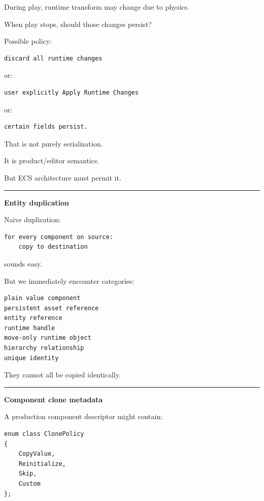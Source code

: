 During play, runtime transform may change due to physics.

When play stops, should those changes persist?

Possible policy:

\begin{verbatim}
discard all runtime changes
\end{verbatim}

or:

\begin{verbatim}
user explicitly Apply Runtime Changes
\end{verbatim}

or:

\begin{verbatim}
certain fields persist.
\end{verbatim}

That is not purely serialization.

It is product/editor semantics.

But ECS architecture must permit it.

\begin{center}\rule{0.5\linewidth}{0.5pt}\end{center}

\textbf{Entity duplication}

Naive duplication:

\begin{verbatim}
for every component on source:
    copy to destination
\end{verbatim}

sounds easy.

But we immediately encounter categories:

\begin{verbatim}
plain value component
persistent asset reference
entity reference
runtime handle
move-only runtime object
hierarchy relationship
unique identity
\end{verbatim}

They cannot all be copied identically.

\begin{center}\rule{0.5\linewidth}{0.5pt}\end{center}

\textbf{Component clone metadata}

A production component descriptor might contain:

\begin{verbatim}
enum class ClonePolicy
{
    CopyValue,
    Reinitialize,
    Skip,
    Custom
};
\end{verbatim}

